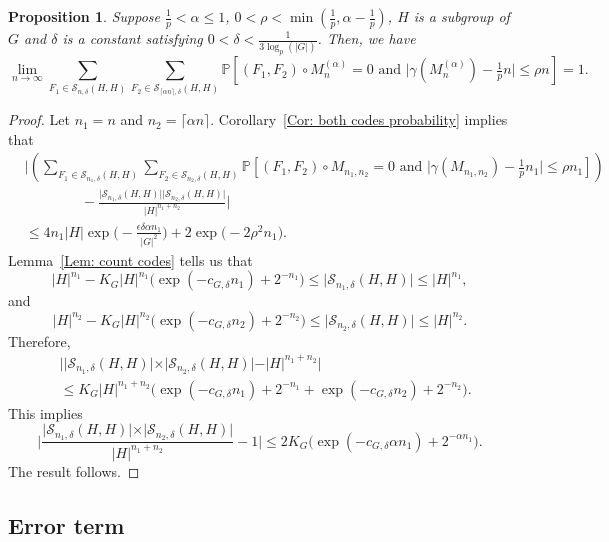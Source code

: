 \documentclass[12pt]{amsart}
\newtheorem{proposition}[theorem]{Proposition}
\theoremstyle{definition}
\newcommand{\PPP}{\mathbb{P}}
\newcommand{\SSS}[3]{\mathcal{S}_{#1}(#2,#3)}
\newcommand{\Mnot}{M_{n_1,n_2}}
\newcommand{\Mna}{M_{n}^{(\alpha)}}
\newcommand{\abs}[1]{\vert#1\vert}
\newcommand{\ceil}[1]{\lceil#1\rceil}
\begin{document}
\begin{proposition}\label{Prop: ind diag main term}
Suppose $\frac{1}{p}<\alpha\leq 1$, $0<\rho<\min(\frac{1}{p},\alpha-\frac{1}{p})$, $H$ is a subgroup of $G$ and $\delta$ is a constant satisfying $0<\delta<\frac{1}{3\log_p(\abs{G})}$.
Then, we have
\[
\lim_{n\to\infty}
\sum_{F_1\in \SSS{n,\delta}{H}{H}}
\sum_{F_2\in \SSS{\ceil{\alpha n},\delta}{H}{H}}
\PPP[(F_1,F_2)\circ \Mna=0 \text{ and }
\abs{\gamma(\Mna) -\tfrac{1}{p} n}\leq \rho n] 
= 1.
\]
\end{proposition}
\begin{proof}
Let $n_1=n$ and $n_2=\ceil{\alpha n}$.
Corollary~\ref{Cor: both codes probability} implies that
\begin{align*}
&\Bigg|
\left(
\sum_{F_1\in \SSS{n_1,\delta}{H}{H}}
\sum_{F_2\in \SSS{n_2,\delta}{H}{H}}
\PPP[(F_1,F_2)\circ \Mnot=0 \text{ and }
\abs{\gamma(\Mnot) -\tfrac{1}{p} n_1}\leq \rho n_1] 
\right)\\
&\quad\quad\quad\quad- \frac{\abs{\SSS{n_1,\delta}{H}{H}}\abs{\SSS{n_2,\delta}{H}{H}}}{\abs{H}^{n_1+n_2}}
\Bigg|\\
&\leq 4n_1\abs{H} \exp\Big(-\frac{\epsilon\delta \alpha n_1}{|G|^2}\Big)
+ 2\exp\big(-2\rho^2 n_1\big).
\end{align*}
Lemma~\ref{Lem: count codes} tells us that
\[
\abs{H}^{n_1}
-K_G \abs{H}^{n_1}\Big( \exp(-c_{G,\delta}n_1) +2^{-n_1} \Big)
\leq \abs{\SSS{n_1,\delta}{H}{H}}
\leq \abs{H}^{n_1},
\]
and
\[
\abs{H}^{n_2}
-K_G \abs{H}^{n_2} \Big( \exp(-c_{G,\delta}n_2) +2^{-n_2} \Big)
\leq \abs{\SSS{n_2,\delta}{H}{H}}
\leq \abs{H}^{n_2}.
\]
Therefore,
\begin{align*}
&\Big|
\abs{\SSS{n_1,\delta}{H}{H}}
\times\abs{\SSS{n_2,\delta}{H}{H}}
-\abs{H}^{n_1+n_2}
\Big|\\
&\leq K_G \abs{H}^{n_1+n_2} 
\Big(\exp(-c_{G,\delta}n_1)+ 2^{-n_1}+ \exp(-c_{G,\delta}n_2) +2^{-n_2}\Big).
\end{align*}
This implies
\[
\bigg|
\frac{\abs{\SSS{n_1,\delta}{H}{H}}
\times\abs{\SSS{n_2,\delta}{H}{H}}}{\abs{H}^{n_1+n_2}}
-1
\bigg|
\leq 2 K_G \Big(\exp(-c_{G,\delta}\alpha n_1) +2^{-\alpha n_1} \Big).
\]
The result follows.
\end{proof}













\subsection{Error term}
\end{document}
